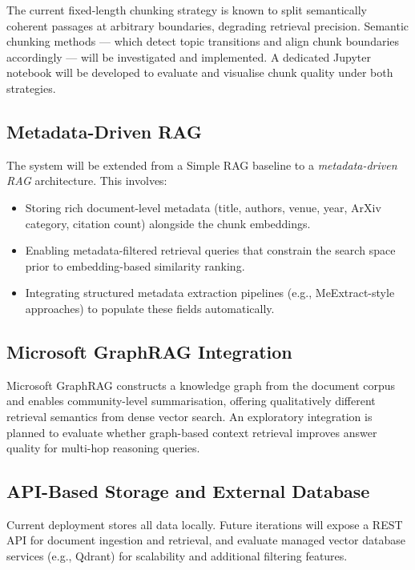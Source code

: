 \documentclass[12pt, a4paper]{article}
\begin{document}
The current fixed-length chunking strategy is known to split semantically
coherent passages at arbitrary boundaries, degrading retrieval precision.
Semantic chunking methods --- which detect topic transitions and align
chunk boundaries accordingly --- will be investigated and implemented.
A dedicated Jupyter notebook will be developed to evaluate and visualise
chunk quality under both strategies.

\subsection{Metadata-Driven RAG}

The system will be extended from a Simple RAG baseline to a
\emph{metadata-driven RAG} architecture. This involves:

\begin{itemize}[leftmargin=*]
    \item Storing rich document-level metadata (title, authors, venue,
          year, ArXiv category, citation count) alongside the chunk
          embeddings.
    \item Enabling metadata-filtered retrieval queries that constrain the
          search space prior to embedding-based similarity ranking.
    \item Integrating structured metadata extraction pipelines (e.g.,
          MeExtract-style approaches) to populate these fields
          automatically.
\end{itemize}

\subsection{Microsoft GraphRAG Integration}

Microsoft GraphRAG \cite{edge2024graphrag} constructs a knowledge graph
from the document corpus and enables community-level summarisation,
offering qualitatively different retrieval semantics from dense vector
search. An exploratory integration is planned to evaluate whether
graph-based context retrieval improves answer quality for multi-hop
reasoning queries.

\subsection{API-Based Storage and External Database}

Current deployment stores all data locally. Future iterations will
expose a REST API for document ingestion and retrieval, and evaluate
managed vector database services (e.g., Qdrant) for scalability and
additional filtering features.
\end{document}
